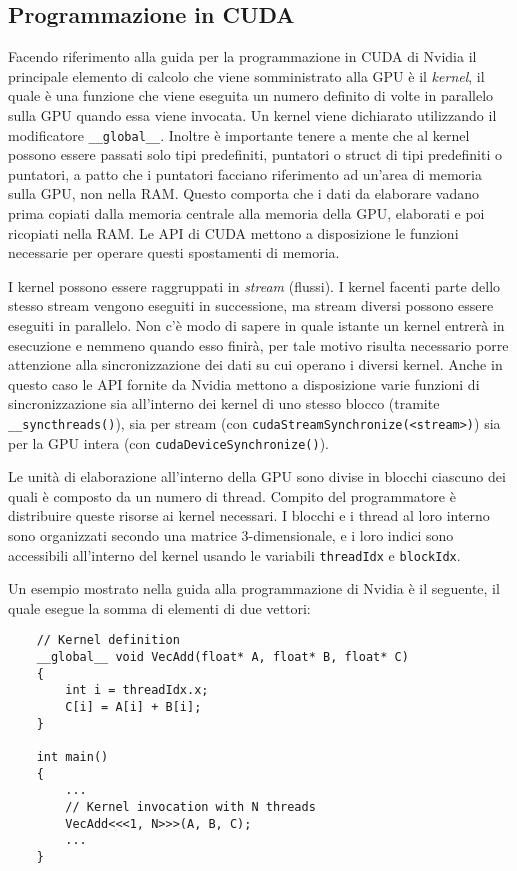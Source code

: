 \subsection{Programmazione in CUDA}
Facendo riferimento alla guida per la programmazione in CUDA di Nvidia\cite{cuda_programming_guide} il principale elemento di calcolo che viene somministrato alla GPU è il \textit{kernel}, il quale è una funzione che viene eseguita un numero definito di volte in parallelo sulla GPU quando essa viene invocata. Un kernel viene dichiarato utilizzando il modificatore \lstinline{__global__}. Inoltre è importante tenere a mente che al kernel possono essere passati solo tipi predefiniti, puntatori o struct di tipi predefiniti o puntatori, a patto che i puntatori facciano riferimento ad un'area di memoria sulla GPU, non nella RAM. Questo comporta che i dati da elaborare vadano prima copiati dalla memoria centrale alla memoria della GPU, elaborati e poi ricopiati nella RAM. Le API di CUDA mettono a disposizione le funzioni necessarie per operare questi spostamenti di memoria.

I kernel possono essere raggruppati in \textit{stream} (flussi). I kernel facenti parte dello stesso stream vengono eseguiti in successione, ma stream diversi possono essere eseguiti in parallelo. Non c'è modo di sapere in quale istante un kernel entrerà in esecuzione e nemmeno quando esso finirà, per tale motivo risulta necessario porre attenzione alla sincronizzazione dei dati su cui operano i diversi kernel. Anche in questo caso le API fornite da Nvidia mettono a disposizione varie funzioni di sincronizzazione sia all'interno dei kernel di uno stesso blocco (tramite \lstinline!__syncthreads()!), sia per stream (con \lstinline!cudaStreamSynchronize(<stream>)!) sia per la GPU intera (con \lstinline!cudaDeviceSynchronize()!).

Le unità di elaborazione all'interno della GPU sono divise in blocchi ciascuno dei quali è composto da un numero di thread. Compito del programmatore è distribuire queste risorse ai kernel necessari. I blocchi e i thread al loro interno sono organizzati secondo una matrice 3-dimensionale, e i loro indici sono accessibili all'interno del kernel usando le variabili \lstinline{threadIdx} e \lstinline{blockIdx}.

Un esempio mostrato nella guida alla programmazione di Nvidia è il seguente, il quale esegue la somma di elementi di due vettori:

\begin{lstlisting}
    // Kernel definition
    __global__ void VecAdd(float* A, float* B, float* C)
    {
        int i = threadIdx.x;
        C[i] = A[i] + B[i];
    }

    int main()
    {
        ...
        // Kernel invocation with N threads
        VecAdd<<<1, N>>>(A, B, C);
        ...
    }
\end{lstlisting}